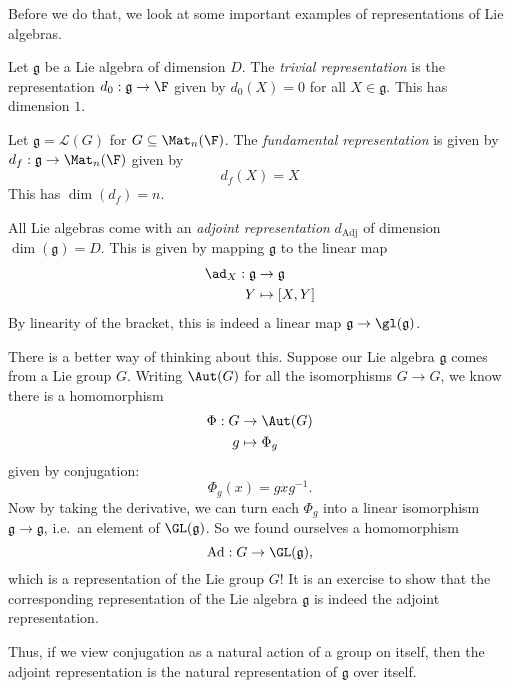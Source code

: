 \documentclass[a4paper]{article}
\begin{document}
Before we do that, we look at some important examples of representations of Lie algebras.
\begin{defi}
  Let $\mathfrak{g}$ be a Lie algebra of dimension $D$. The \emph{trivial representation} is the representation $d_0: \mathfrak{g} \to \F$ given by $d_0(X) = 0$ for all $X \in \mathfrak{g}$. This has dimension $1$.
\end{defi}

\begin{defi}
  Let $\mathfrak{g} = \mathcal{L}(G)$ for $G \subseteq \Mat_n(\F)$. The \emph{fundamental representation} is given by $d_f: \mathfrak{g} \to \Mat_n(\F)$ given by
  \[
    d_f (X) = X
  \]
  This has $\dim (d_f) = n$.
\end{defi}

\begin{defi}
  All Lie algebras come with an \emph{adjoint representation} $d_\mathrm{Adj}$ of dimension $\dim(\mathfrak{g}) = D$. This is given by mapping $\mathfrak{g}$ to the linear map
  \begin{align*}
    \ad_X: \mathfrak{g} &\to \mathfrak{g}\\
    Y &\mapsto [X, Y]
  \end{align*}
  By linearity of the bracket, this is indeed a linear map $\mathfrak{g} \to \gl(\mathfrak{g})$.
\end{defi}
There is a better way of thinking about this. Suppose our Lie algebra $\mathfrak{g}$ comes from a Lie group $G$. Writing $\Aut(G)$ for all the isomorphisms $G \to G$, we know there is a homomorphism
\begin{align*}
  \Phi: G &\to \Aut(G)\\
  g &\mapsto \Phi_g
\end{align*}
given by conjugation:
\[
  \Phi_g(x) = gxg^{-1}.
\]
Now by taking the derivative, we can turn each $\Phi_g$ into a linear isomorphism $\mathfrak{g} \to \mathfrak{g}$, i.e.\ an element of $\GL(\mathfrak{g})$. So we found ourselves a homomorphism
\[
  \mathrm{Ad}: G \to \GL(\mathfrak{g}),
\]
which is a representation of the Lie group $G$! It is an exercise to show that the corresponding representation of the Lie algebra $\mathfrak{g}$ is indeed the adjoint representation.

Thus, if we view conjugation as a natural action of a group on itself, then the adjoint representation is the natural representation of $\mathfrak{g}$ over itself.
\end{document}
